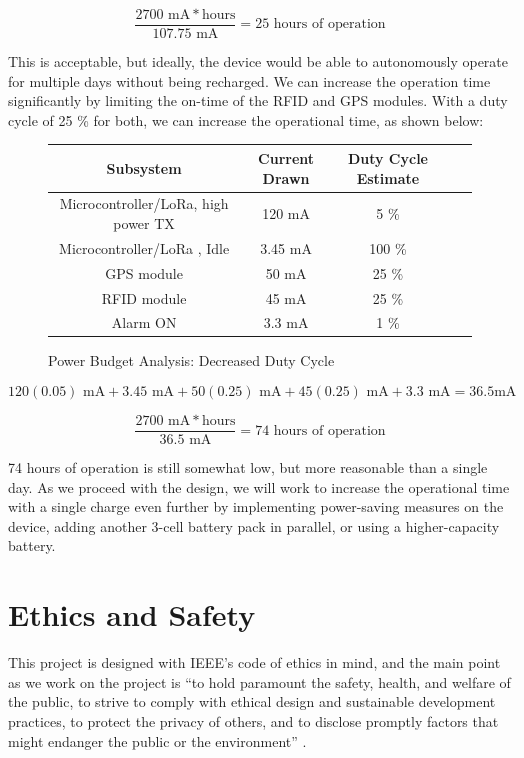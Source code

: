 \documentclass{article}
\begin{document}
$$ 
\frac{2700 \text{ mA}*\text{hours}}{107.75 \text{ mA} } = 25 \text{ hours of operation}
$$


This is acceptable, but ideally, the device would be able to autonomously operate for multiple days without being recharged. We can increase the operation time significantly by limiting the on-time of the RFID and GPS modules. With a duty cycle of 25 \% for both, we can increase the operational time, as shown below: 
\begin{figure}[H]
	\begin{center}
		\begin{tabular}{|c|c|c|c|c|}
			\hline
			\textbf{Subsystem} &  \textbf{Current Drawn} & \textbf{Duty Cycle Estimate} \\
			\hline
			Microcontroller/LoRa, high power TX \cite{stm_datasheet} & 120 mA & 5 \% \\
			\hline
			Microcontroller/LoRa \cite{stm_datasheet}, Idle & 3.45 mA & 100 \% \\
			\hline 
			GPS module \cite{gps} & 50 mA & 25 \% \\
			\hline
			RFID module \cite{rfid} & 45 mA & 25 \% \\ 
			\hline 
			Alarm ON & 3.3 mA & 1 \% \\ 
			\hline
			
			
		\end{tabular}
	\end{center}
	\caption{Power Budget Analysis: Decreased Duty Cycle}
\end{figure}
$$ 
120(0.05)\text{ mA} + 3.45\text{ mA} + 50(0.25) \text{ mA}+ 45(0.25) \text{ mA}+ 3.3 \text{ mA}= 36.5 \text{mA}
$$


$$ 
\frac{2700 \text{ mA}*\text{hours}}{36.5 \text{ mA} } = 74 \text{ hours of operation}
$$


74 hours of operation is still somewhat low, but more reasonable than a single day. As we proceed with the design, we will work to increase the operational time with a single charge even further by implementing power-saving measures on the device, adding another 3-cell battery pack in parallel, or using a higher-capacity battery. 

\section{Ethics and Safety}
This project is designed with IEEE’s code of ethics in mind, and the main point as we work on the project is “to hold paramount the safety, health, and welfare of the public, to strive to comply with ethical design and sustainable development practices, to protect the privacy of others, and to disclose promptly factors that might endanger the public or the environment” \cite{ethics}.
\end{document}
